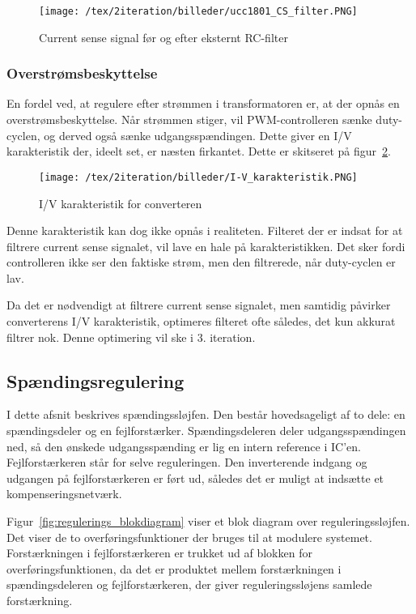 \begin{figure}[H]
	\center
	\texttt{[image: /tex/2iteration/billeder/ucc1801\_CS\_filter.PNG]}
	\caption{Current sense signal før og efter eksternt RC-filter}
	\label{fig:ucc1801_CS_filter}
\end{figure}

\subsubsection{Overstrømsbeskyttelse} \label{CS_protection}
En fordel ved, at regulere efter strømmen i transformatoren er, at der opnås en overstrømsbeskyttelse. Når strømmen stiger, vil PWM-controlleren sænke duty-cyclen, og derved også sænke udgangsspændingen. Dette giver en I/V karakteristik der, ideelt set, er næsten firkantet. Dette er skitseret på figur~\ref{fig:I-V_karateristik}. 

\begin{figure}[H]
	\center
	\texttt{[image: /tex/2iteration/billeder/I-V\_karakteristik.PNG]}
	\caption{I/V karakteristik for converteren}
	\label{fig:I-V_karateristik}
\end{figure}

Denne karakteristik kan dog ikke opnås i realiteten. Filteret der er indsat for at filtrere current sense signalet, vil lave en hale på karakteristikken. Det sker fordi controlleren ikke ser den faktiske strøm, men den filtrerede, når duty-cyclen er lav. 

Da det er nødvendigt at filtrere current sense signalet, men samtidig påvirker converterens I/V karakteristik, optimeres filteret ofte således, det kun akkurat filtrer nok. Denne optimering vil ske i 3. iteration. 

\subsection{Spændingsregulering} \label{V_loop}
I dette afsnit beskrives spændingssløjfen. Den består hovedsageligt af to dele: en spændingsdeler og en fejlforstærker. Spændingsdeleren deler udgangsspændingen ned, så den ønskede udgangsspænding er lig en intern reference i IC'en. Fejlforstærkeren står for selve reguleringen. Den inverterende indgang og udgangen på fejlforstærkeren er ført ud, således det er muligt at indsætte et kompenseringsnetværk.

Figur~\ref{fig:regulerings_blokdiagram} viser et blok diagram over reguleringssløjfen. Det viser de to overføringsfunktioner der bruges til at modulere systemet. Forstærkningen i fejlforstærkeren er trukket ud af blokken for overføringsfunktionen, da det er produktet mellem forstærkningen i spændingsdeleren og fejlforstærkeren, der giver reguleringssløjens samlede forstærkning. 

